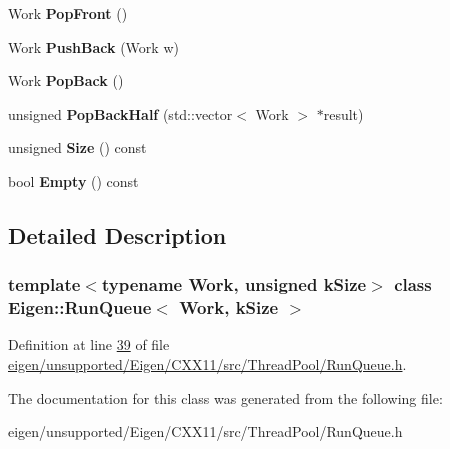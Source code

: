 \begin{DoxyCompactItemize}
\mbox{\label{class_eigen_1_1_run_queue_a70485d807cb89b34d882471f069eeeea}} 
Work {\bfseries Pop\+Front} ()
\item 
\mbox{\label{class_eigen_1_1_run_queue_a205fedbfce51498cde3069171ff4790d}} 
Work {\bfseries Push\+Back} (Work w)
\item 
\mbox{\label{class_eigen_1_1_run_queue_a5f0a65d40022baef3d77abb8226f35b0}} 
Work {\bfseries Pop\+Back} ()
\item 
\mbox{\label{class_eigen_1_1_run_queue_a583d558af80e41729d7808ed5dfa25d9}} 
unsigned {\bfseries Pop\+Back\+Half} (std\+::vector$<$ Work $>$ $\ast$result)
\item 
\mbox{\label{class_eigen_1_1_run_queue_aa193d3baea623281da1886603799dd87}} 
unsigned {\bfseries Size} () const
\item 
\mbox{\label{class_eigen_1_1_run_queue_aa7abe7eea034f24a03843b90109636dc}} 
bool {\bfseries Empty} () const
\end{DoxyCompactItemize}


\subsection{Detailed Description}
\subsubsection*{template$<$typename Work, unsigned k\+Size$>$\newline
class Eigen\+::\+Run\+Queue$<$ Work, k\+Size $>$}



Definition at line \hyperlink{eigen_2unsupported_2_eigen_2_c_x_x11_2src_2_thread_pool_2_run_queue_8h_source_l00039}{39} of file \hyperlink{eigen_2unsupported_2_eigen_2_c_x_x11_2src_2_thread_pool_2_run_queue_8h_source}{eigen/unsupported/\+Eigen/\+C\+X\+X11/src/\+Thread\+Pool/\+Run\+Queue.\+h}.



The documentation for this class was generated from the following file\+:\begin{DoxyCompactItemize}
\item 
eigen/unsupported/\+Eigen/\+C\+X\+X11/src/\+Thread\+Pool/\+Run\+Queue.\+h\end{DoxyCompactItemize}
